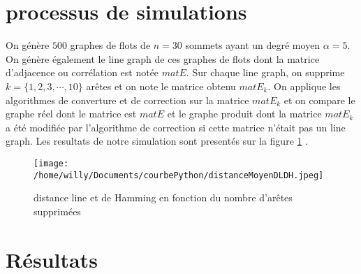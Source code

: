 \documentclass[onecolumn, 12pt]{book}
\begin{document}
\section{processus de simulations}
On g\'en\`ere $500$ graphes de flots de $n = 30$ sommets ayant un degr\'e moyen $\alpha = 5$.
On g\'en\`ere \'egalement le line graph de ces graphes de flots dont la matrice d'adjacence ou corr\'elation est not\'ee $matE$.
Sur chaque line graph, on supprime $k = \{1,2,3,\cdots, 10\}$ ar\^etes et on note le matrice obtenu $matE_{k}$.
On applique les algorithmes de converture et de correction sur la matrice $matE_{k}$ et on compare le graphe r\'eel dont le matrice est  $matE$ et le graphe produit dont la matrice $matE_{k}$ a \'et\'e modifi\'ee par l'algorithme de correction si cette matrice n'\'etait pas un line graph. 
Les resultats de notre simulation sont present\'es sur la figure \ref{distanceHammingDLDH} .

\begin{centering} 
\begin{figure}[htb!] 
\texttt{[image: /home/willy/Documents/courbePython/distanceMoyenDLDH.jpeg]}
\caption{ distance line et de Hamming en fonction du nombre d'ar\^etes supprim\'ees }
\label{distanceHammingDLDH} 
\end{figure}
\end{centering} 

 
 
\section{R\'esultats}
\end{document}
